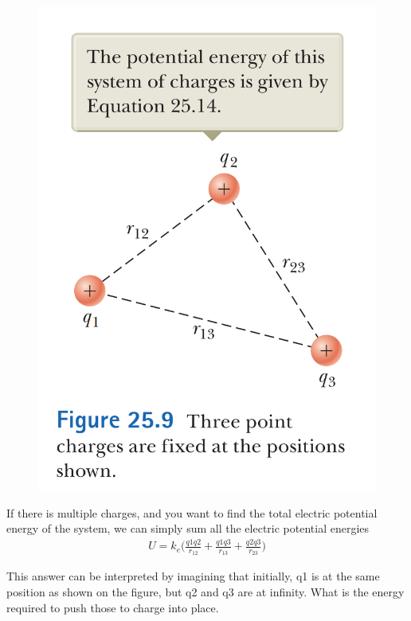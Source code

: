 \documentclass[12pt, titlepage, oneside]{article}
\begin{document}
\begin{figure}
	\begin{center}\vspace{-1.1cm}
		\includegraphics[scale=0.3]{4.png}
	\end{center}
\end{figure} 
If there is multiple charges, and you want to find the total electric potential energy of the system, we can simply sum all the electric potential energies
\begin{align*}
U = k_e \Bigg(\frac{q1q2}{r_{12}} + \frac{q1q3}{r_{13}} + \frac{q2q3}{r_{23}} \Bigg)
\end{align*}

This answer can be interpreted by imagining that initially, q1 is at the same position as shown on the figure, but q2 and q3 are at infinity. What is the energy required to push those to charge into place.
\end{document}
